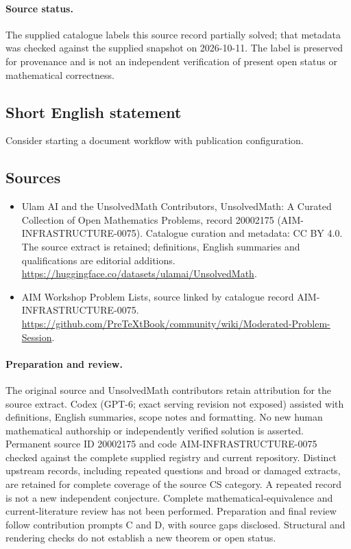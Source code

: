 \documentclass[11pt]{article}
\begin{document}
\paragraph{Source status.}
The supplied catalogue labels this source record partially solved; that metadata was checked against the supplied snapshot on 2026-10-11. The label is preserved for provenance and is not an independent verification of present open status or mathematical correctness.
\subsection{Short English statement}
Consider starting a document workflow with publication configuration.
\subsection{Sources}
\begin{itemize}
\item[\hypertarget{source:20002175:1}{S1}] Ulam AI and the UnsolvedMath Contributors, UnsolvedMath: A Curated Collection of Open Mathematics Problems, record 20002175 (AIM-INFRASTRUCTURE-0075). Catalogue curation and metadata: CC BY 4.0. The source extract is retained; definitions, English summaries and qualifications are editorial additions.
\url{https://huggingface.co/datasets/ulamai/UnsolvedMath}.
\item[\hypertarget{source:20002175:2}{S2}] AIM Workshop Problem Lists, source linked by catalogue record AIM-INFRASTRUCTURE-0075.
\url{https://github.com/PreTeXtBook/community/wiki/Moderated-Problem-Session}.
\end{itemize}
\paragraph{Preparation and review.}
The original source and UnsolvedMath contributors retain attribution for the source extract. Codex (GPT-6; exact serving revision not exposed) assisted with definitions, English summaries, scope notes and formatting. No new human mathematical authorship or independently verified solution is asserted. Permanent source ID 20002175 and code AIM-INFRASTRUCTURE-0075 checked against the complete supplied registry and current repository. Distinct upstream records, including repeated questions and broad or damaged extracts, are retained for complete coverage of the source CS category. A repeated record is not a new independent conjecture. Complete mathematical-equivalence and current-literature review has not been performed. Preparation and final review follow contribution prompts C and D, with source gaps disclosed. Structural and rendering checks do not establish a new theorem or open status.
\label{end:20002175}
\end{document}
